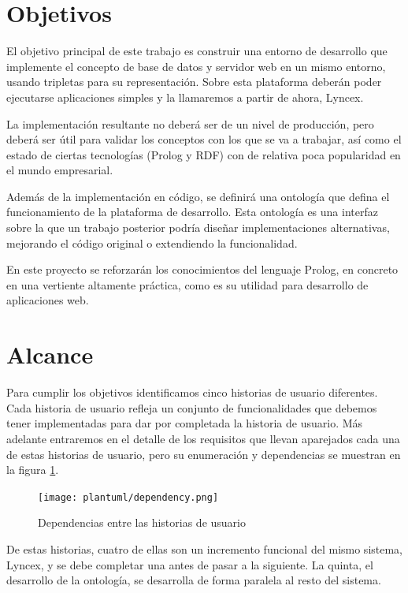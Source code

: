 \documentclass[12pt]{report} %
\begin{document}
\section{Objetivos}

El objetivo principal de este trabajo es construir una entorno de desarrollo que implemente el concepto de base de datos y servidor web en un mismo entorno, usando tripletas para su representación. Sobre esta plataforma deberán poder ejecutarse aplicaciones simples y la llamaremos a partir de ahora, Lyncex.

La implementación resultante no deberá ser de un nivel de producción, pero deberá ser útil para validar los conceptos con los que se va a trabajar, así como el estado de ciertas tecnologías (Prolog y RDF) con de relativa poca popularidad en el mundo empresarial.\cite{stackoverflowsurvey}

Además de la implementación en código, se definirá una ontología que defina el funcionamiento de la plataforma de desarrollo. Esta ontología es una interfaz sobre la que un trabajo posterior podría diseñar implementaciones alternativas, mejorando el código original o extendiendo la funcionalidad.

En este proyecto se reforzarán los conocimientos del lenguaje Prolog, en concreto en una vertiente altamente práctica, como es su utilidad para desarrollo de aplicaciones web.

\section{Alcance}

Para cumplir los objetivos identificamos cinco historias de usuario diferentes. Cada historia de usuario refleja un conjunto de funcionalidades que debemos tener implementadas para dar por completada la historia de usuario. Más adelante entraremos en el detalle de los requisitos que llevan aparejados cada una de estas historias de usuario, pero su enumeración y dependencias se muestran en la figura \ref{fig:dependencia}.

\begin{figure}[h]
    \centering
    \texttt{[image: plantuml/dependency.png]}
    \caption{Dependencias entre las historias de usuario}
    \label{fig:dependencia}
\end{figure}

De estas historias, cuatro de ellas son un incremento funcional del mismo sistema, Lyncex, y se debe completar una antes de pasar a la siguiente. La quinta, el desarrollo de la ontología, se desarrolla de forma paralela al resto del sistema.
\end{document}
